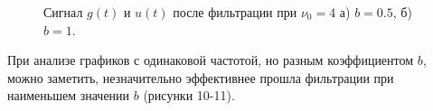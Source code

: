 \documentclass[a5paper, 10pt]{article}
\theoremstyle{definition}
\theoremstyle{plain}
\theoremstyle{remark}
\begin{document}
\begin{figure}[h!]
\begin{minipage}[h]{0.5\linewidth}
\end{minipage}
\hfill
\begin{minipage}[h]{0.5\linewidth}
\end{minipage}
\caption{Сигнал $g(t)$ и $u(t)$ после фильтрации при $\nu_0 = 4$ а) $b=0.5$, б) $b=1$.}
\end{figure}

\newpage
При анализе графиков с одинаковой частотой, но разным коэффициентом $b$, можно заметить,  незначительно эффективнее прошла фильтрации при наименьшем значении $b$ (рисунки 10-11).
\end{document}

